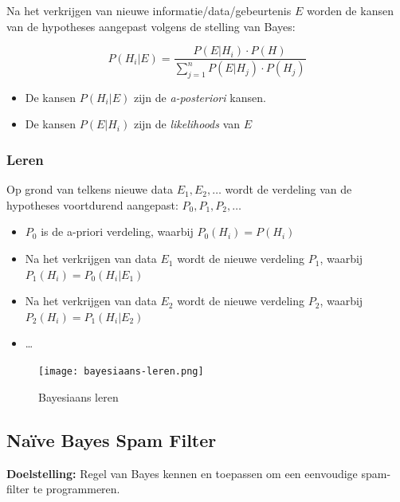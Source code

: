 \documentclass{article}
\begin{document}
Na het verkrijgen van nieuwe informatie/data/gebeurtenis $E$ worden de kansen van de hypotheses aangepast volgens de stelling van Bayes:

\begin{equation}
    P(H_i | E) = \frac{P(E | H_i) \cdot P(H)}{\sum_{j=1}^n P(E | H_j) \cdot P(H_j)}
\end{equation}


\begin{itemize}
    \item De kansen $P(H_i | E)$ zijn de \textit{a-posteriori} kansen. 
    \item De kansen $P(E | H_i)$ zijn de \textit{likelihoods} van $E$
\end{itemize}

\subsubsection{Leren}

Op grond van telkens nieuwe data $E_1, E_2, \dots$ wordt de verdeling van de hypotheses voortdurend aangepast: $P_0, P_1, P_2, \dots$

\begin{itemize}
    \item $P_0$ is de a-priori verdeling, waarbij $P_0(H_i) = P(H_i)$
    \item Na het verkrijgen van data $E_1$ wordt de nieuwe verdeling $P_1$, waarbij $P_1(H_i) = P_0(H_i | E_1)$
    \item Na het verkrijgen van data $E_2$ wordt de nieuwe verdeling $P_2$, waarbij $P_2(H_i) = P_1(H_i | E_2)$
    \item \dots
\end{itemize}


\begin{figure}[H]
    \centering
    \texttt{[image: bayesiaans-leren.png]}
    \caption{Bayesiaans leren}
\end{figure}


\subsection{Naïve Bayes Spam Filter}

\textbf{Doelstelling:} Regel van Bayes kennen en toepassen om een eenvoudige spam-filter te programmeren.
\end{document}
